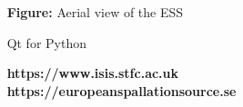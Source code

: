 \documentclass[usenames,dvipsnames]{beamer}
\begin{document}
\begin{frame}[t]
\begin{columns}[t]
\begin{column}{0.32\paperwidth}
\end{column}
\begin{column}{0.32\paperwidth}
\vspace{-10pt}

\begin{tcolorbox}[enhanced,width=\linewidth,height=14cm,arc=5mm,
       interior style={fill overzoom image*={}{essaerial.jpg}}]
\end{tcolorbox}
\vspace{-40pt}
\begin{center}
\color{white}\large\textbf{Figure:  }{Aerial view of the ESS}
\end{center}

\begin{custombox}{Qt for Python}

\end{custombox}

\begin{tcolorbox}[enhanced,width=\linewidth,height=21.5cm,arc=5mm,
       interior style={fill overzoom image*={}{beamon.png}}]
\end{tcolorbox}

\vspace{-1.5cm}
\begin{center}
\color{white}\LARGE\textbf{https://www.isis.stfc.ac.uk\\https://europeanspallationsource.se}
\end{center}
\end{column}
\end{columns}
\end{frame}
\end{document}
